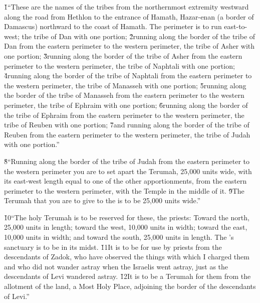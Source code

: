 \v{1}``These are the names of the tribes from the northernmost extremity westward along the road from Hethlon to the entrance of Hamath, Hazar-enan (a border of Damascus) northward to the coast of Hamath. The perimeter is to run east-to-west; the tribe of Dan with one portion; \v{2}running along the border of the tribe of Dan from the eastern perimeter to the western perimeter, the tribe of Asher with one portion; \v{3}running along the border of the tribe of Asher from the eastern perimeter to the western perimeter, the tribe of Naphtali with one portion; \v{4}running along the border of the tribe of Naphtali from the eastern perimeter to the western perimeter, the tribe of Manasseh with one portion; \v{5}running along the border of the tribe of Manasseh from the eastern perimeter to the western perimeter, the tribe of Ephraim with one portion; \v{6}running along the border of the tribe of Ephraim from the eastern perimeter to the western perimeter, the tribe of Reuben with one portion; \v{7}and running along the border of the tribe of Reuben from the eastern perimeter to the western perimeter, the tribe of Judah with one portion.''

\v{8}``Running along the border of the tribe of Judah from the eastern perimeter to the western perimeter you are to set apart the Terumah, 25,000 units wide, with its east-west length equal to one of the other apportionments, from the eastern perimeter to the western perimeter, with the Temple in the middle of it. \v{9}The Terumah that you are to give to the  is to be 25,000 units wide.''

\v{10}``The holy Terumah is to be reserved for these, the priests: Toward the north, 25,000 units in length; toward the west, 10,000 units in width; toward the east, 10,000 units in width; and toward the south, 25,000 units in length. The 's sanctuary is to be in its midst. \v{11}It is to be for use by priests from the descendants of Zadok, who have observed the things with which I charged them and who did not wander astray when the Israelis went astray, just as the descendants of Levi wandered astray. \v{12}It is to be a Terumah for them from the allotment of the land, a Most Holy Place, adjoining the border of the descendants of Levi.''

